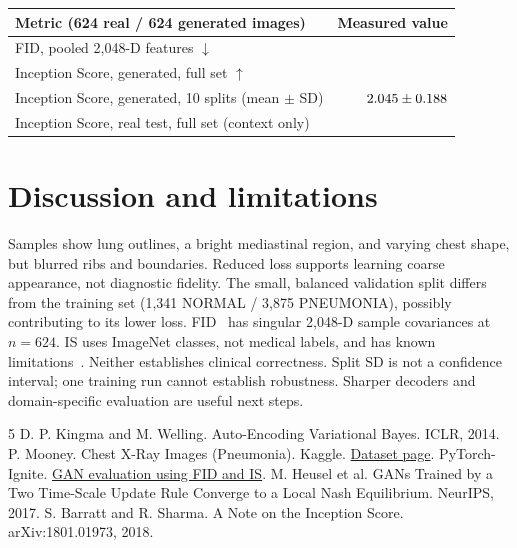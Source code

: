 \documentclass{article}
\begin{document}
\begin{center}
\small
\begin{tabular}{lr}
\toprule
Metric (624 real / 624 generated images) & Measured value\\
\midrule
FID, pooled 2,048-D features $\downarrow$ & \FIDvalue{}\\
Inception Score, generated, full set $\uparrow$ & \ISvalue{}\\
Inception Score, generated, 10 splits (mean $\pm$ SD) & $2.045\pm0.188$\\
Inception Score, real test, full set (context only) & \ISreal{}\\
\bottomrule
\end{tabular}
\end{center}

\section{Discussion and limitations}
Samples show lung outlines, a bright mediastinal region, and varying chest shape,
but blurred ribs and boundaries. Reduced loss supports learning coarse appearance,
not diagnostic fidelity. The small, balanced validation split differs from the
training set (1,341 NORMAL / 3,875 PNEUMONIA), possibly contributing to its lower
loss. FID~\cite{fid} has singular 2,048-D sample covariances at $n=624$.
IS uses ImageNet classes, not medical labels, and has known limitations~\cite{is}.
Neither establishes clinical correctness. Split SD is not a confidence interval;
one training run cannot establish robustness. Sharper decoders and domain-specific
evaluation are useful next steps.

\begin{thebibliography}{5}
\footnotesize
\setlength{\itemsep}{0pt}
\setlength{\parskip}{0pt}
 D. P. Kingma and M. Welling. Auto-Encoding Variational Bayes. ICLR, 2014.
 P. Mooney. Chest X-Ray Images (Pneumonia). Kaggle.
\href{https://www.kaggle.com/datasets/paultimothymooney/chest-xray-pneumonia}{Dataset page}.
 PyTorch-Ignite. \href{https://pytorch-ignite.ai/blog/gan-evaluation-with-fid-and-is/}{GAN evaluation using FID and IS}.
 M. Heusel et al. GANs Trained by a Two Time-Scale Update Rule Converge to a Local Nash Equilibrium. NeurIPS, 2017.
 S. Barratt and R. Sharma. A Note on the Inception Score. arXiv:1801.01973, 2018.
\end{thebibliography}
\end{document}
